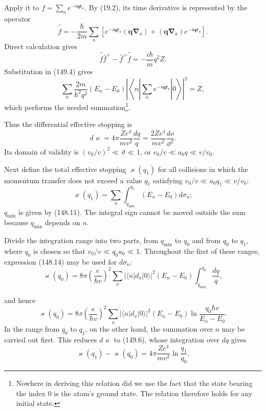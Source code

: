 Apply it to $f=\sum_a e^{-i\mathbf q\mathbf r_a}$. By (19.2), its time derivative is represented by the operator
\[
 \hat{\dot f}=-\frac{\hbar}{2m}\sum_a
 [e^{-i\mathbf q\mathbf r_a}(\mathbf q\boldsymbol\nabla_a)
 +(\mathbf q\boldsymbol\nabla_a)e^{-i\mathbf q\mathbf r_a}].
\]
Direct calculation gives
\[
 \hat{\dot f}\hat f^+-\hat f^+\hat{\dot f}=-\frac{i\hbar}{m}q^2Z.
\]
Substitution in (149.4) gives
\begin{equation}
 \sum_n\frac{2m}{\hbar^2q^2}(E_n-E_0)
 \left|\left\langle n\left|\sum_a e^{-i\mathbf q\mathbf r_a}\right|0\right\rangle\right|^2=Z,
 \tag{149.5}
\end{equation}
which performs the needed summation\footnote{Nowhere in deriving this relation did we use the fact that the state bearing the index 0 is the atom's ground state. The relation therefore holds for any initial state.}.

Thus the differential effective stopping is
\begin{equation}
 d\varkappa=4\pi\frac{Ze^4}{mv^2}\frac{dq}{q}
 =\frac{2Ze^4}{mv^2}\frac{do}{\vartheta^2}.
 \tag{149.6}
\end{equation}
Its domain of validity is $(v_0/v)^2\ll\vartheta\ll1$, or $v_0/v\ll a_0q\ll v/v_0$.

Next define the total effective stopping $\varkappa(q_1)$ for all collisions in which the momentum transfer does not exceed a value $q_1$ satisfying $v_0/v\ll a_0q_1\ll v/v_0$:
\begin{equation}
 \varkappa(q_1)=\sum_n\int_{q_{\min}}^{q_1}(E_n-E_0)d\sigma_n;
 \tag{149.7}
\end{equation}
$q_{\min}$ is given by (148.11). The integral sign cannot be moved outside the sum because $q_{\min}$ depends on $n$.

Divide the integration range into two parts, from $q_{\min}$ to $q_0$ and from $q_0$ to $q_1$, where $q_0$ is chosen so that $v_0/v\ll q_0a_0\ll1$. Throughout the first of these ranges, expression (148.14) may be used for $d\sigma_n$:
\[
 \varkappa(q_0)=8\pi\left(\frac{e}{\hbar v}\right)^2
 \sum_n|\langle n|d_x|0\rangle|^2(E_n-E_0)
 \int_{q_{\min}}^{q_0}\frac{dq}{q},
\]

and hence
\begin{equation}
 \varkappa(q_0)=8\pi\left(\frac{e}{\hbar v}\right)^2
 \sum_n|\langle n|d_x|0\rangle|^2(E_n-E_0)
 \ln\frac{q_0\hbar v}{E_n-E_0}.
 \tag{149.8}
\end{equation}
In the range from $q_0$ to $q_1$, on the other hand, the summation over $n$ may be carried out first. This reduces $d\varkappa$ to (149.6), whose integration over $dq$ gives
\begin{equation}
 \varkappa(q_1)-\varkappa(q_0)=4\pi\frac{Ze^4}{mv^2}\ln\frac{q_1}{q_0}.
 \tag{149.9}
\end{equation}

